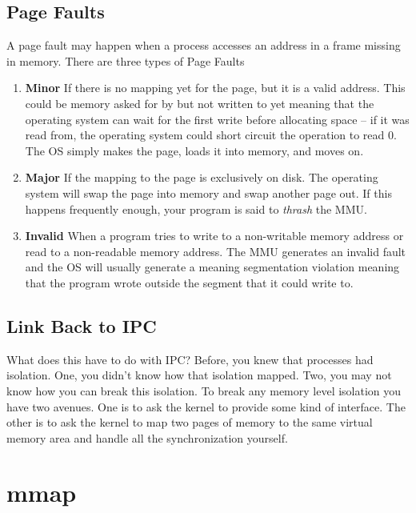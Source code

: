	\subsection{Page Faults}
	 
	A page fault may happen when a process accesses an address in a frame missing in memory.
	There are three types of Page Faults
	 
	\begin{enumerate}
	\item \textbf{Minor} If there is no mapping yet for the page, but it is a valid address.
	 This could be memory asked for by  but not written to yet meaning that the operating system can wait for the first write before allocating space -- if it was read from, the operating system could short circuit the operation to read 0.
	 The OS simply makes the page, loads it into memory, and moves on.
	 
	\item \textbf{Major} If the mapping to the page is exclusively on disk.
	 The operating system will swap the page into memory and swap another page out.
	 If this happens frequently enough, your program is said to \emph{thrash} the MMU.
	 
	\item \textbf{Invalid} When a program tries to write to a non-writable memory address or read to a non-readable memory address.
	 The MMU generates an invalid fault and the OS will usually generate a  meaning segmentation violation meaning that the program wrote outside the segment that it could write to.
	 
	\end{enumerate}
	 
	\subsection{Link Back to IPC}
	 
	What does this have to do with IPC?
	Before, you knew that processes had isolation.
	One, you didn't know how that isolation mapped.
	Two, you may not know how you can break this isolation.
	To break any memory level isolation you have two avenues.
	One is to ask the kernel to provide some kind of interface.
	The other is to ask the kernel to map two pages of memory to the same virtual memory area and handle all the synchronization yourself.
	 
	\section{mmap}
	 
